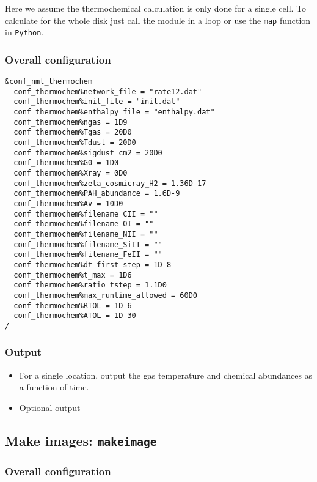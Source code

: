 \documentclass{article}
\newcommand{\cds}[1]{\texttt{#1}}
\newcommand{\python}{\texttt{Python}}
\newcommand{\makeimage}{\texttt{makeimage}}
\begin{document}
Here we assume the thermochemical calculation is only done for a single cell.  To calculate for the whole disk just call the module in a loop or use the \cds{map} function in \python.

\subsubsection{Overall configuration}

\begin{lstlisting}
&conf_nml_thermochem
  conf_thermochem%network_file = "rate12.dat"
  conf_thermochem%init_file = "init.dat"
  conf_thermochem%enthalpy_file = "enthalpy.dat"
  conf_thermochem%ngas = 1D9
  conf_thermochem%Tgas = 20D0
  conf_thermochem%Tdust = 20D0
  conf_thermochem%sigdust_cm2 = 20D0
  conf_thermochem%G0 = 1D0
  conf_thermochem%Xray = 0D0
  conf_thermochem%zeta_cosmicray_H2 = 1.36D-17
  conf_thermochem%PAH_abundance = 1.6D-9
  conf_thermochem%Av = 10D0
  conf_thermochem%filename_CII = ""
  conf_thermochem%filename_OI = ""
  conf_thermochem%filename_NII = ""
  conf_thermochem%filename_SiII = ""
  conf_thermochem%filename_FeII = ""
  conf_thermochem%dt_first_step = 1D-8
  conf_thermochem%t_max = 1D6
  conf_thermochem%ratio_tstep = 1.1D0
  conf_thermochem%max_runtime_allowed = 60D0
  conf_thermochem%RTOL = 1D-6
  conf_thermochem%ATOL = 1D-30
/
\end{lstlisting}

\subsubsection{Output}

\begin{itemize}
  \item For a single location, output the gas temperature and chemical abundances as a function of time.
  \item Optional output
\end{itemize}  

\subsection{Make images: \makeimage}

\subsubsection{Overall configuration}
\end{document}
